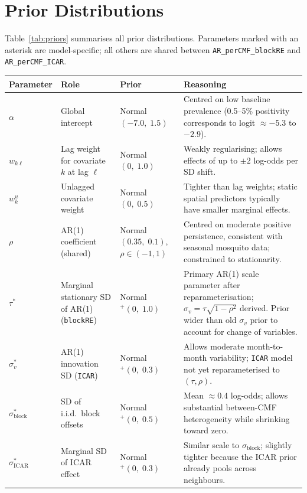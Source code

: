 \documentclass[12pt,a4paper]{article}
\begin{document}
\section{Prior Distributions}

Table~\ref{tab:priors} summarises all prior distributions. Parameters marked with an asterisk
are model-specific; all others are shared between \texttt{AR\_perCMF\_blockRE} and
\texttt{AR\_perCMF\_ICAR}.

\begin{table}[ht]
\centering
\small
\begin{tabular}{p{2.0cm}p{3.2cm}p{3.0cm}p{5.8cm}}
\toprule
\textbf{Parameter} & \textbf{Role} & \textbf{Prior} & \textbf{Reasoning} \\
\midrule
$\alpha$ & Global intercept & Normal$(-7.0,\; 1.5)$ & Centred on low baseline prevalence (0.5--5\% positivity corresponds to logit $\approx -5.3$ to $-2.9$). \\
\addlinespace
$w_{k\ell}$ & Lag weight for covariate $k$ at lag $\ell$ & Normal$(0,\; 1.0)$ & Weakly regularising; allows effects of up to $\pm 2$ log-odds per SD shift. \\
\addlinespace
$w_k^u$ & Unlagged covariate weight & Normal$(0,\; 0.5)$ & Tighter than lag weights; static spatial predictors typically have smaller marginal effects. \\
\addlinespace
$\rho$ & AR(1) coefficient (shared) & Normal$(0.35,\; 0.1)$, $\rho \in (-1,1)$ & Centred on moderate positive persistence, consistent with seasonal mosquito data; constrained to stationarity. \\
\addlinespace
$\tau^*$ & Marginal stationary SD of AR(1) (\texttt{blockRE}) & Normal$^+(0,\; 1.0)$ & Primary AR(1) scale parameter after reparameterisation; $\sigma_v = \tau\sqrt{1-\rho^2}$ derived. Prior wider than old $\sigma_v$ prior to account for change of variables. \\
\addlinespace
$\sigma_v^*$ & AR(1) innovation SD (\texttt{ICAR}) & Normal$^+(0,\; 0.3)$ & Allows moderate month-to-month variability; \texttt{ICAR} model not yet reparameterised to $(\tau,\rho)$. \\
\addlinespace
$\sigma_{\text{block}}^*$ & SD of i.i.d.\ block offsets & Normal$^+(0,\; 0.5)$ & Mean $\approx 0.4$ log-odds; allows substantial between-CMF heterogeneity while shrinking toward zero. \\
\addlinespace
$\sigma_{\text{ICAR}}^*$ & Marginal SD of ICAR effect & Normal$^+(0,\; 0.3)$ & Similar scale to $\sigma_{\text{block}}$; slightly tighter because the ICAR prior already pools across neighbours. \\

\end{tabular}
\end{table}
\end{document}
